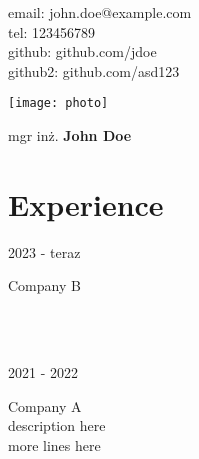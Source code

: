 \documentclass[12pt]{article}
\makeatletter
\newcommand{\signature}{
  \begin{flushright}
    {\huge mgr inż. \textbf{John Doe}}
  \end{flushright}
}
\newcommand{\photo}{
  \begin{center}
    \texttt{[image: photo]}
  \end{center}
}
\newcommand{\contactinfo}{
  \noindent
  email: john.doe@example.com\\
  tel: 123456789\\
  github: github.com/jdoe\\
  github2: github.com/asd123
}
\newcommand\historyentry[3]{
  \parbox[b]{70pt}{#1}
  \color{teal}
  \makebox[0pt][c]{$\bullet$}\vrule\quad
  \color{black}
  \parbox[t]{455pt}{\Large #2\\\normalsize #3\\[5pt]}\\[-3pt]
}
\makeatother
\begin{document}
\begin{paracol}{2}
  \begin{leftcolumn}
    \contactinfo
    \photo
  \end{leftcolumn}
  \begin{rightcolumn}
    \signature
    \section*{}
    \blindtext
  \end{rightcolumn}
\end{paracol}
\section*{Experience}
\historyentry{2023 - teraz}{Company B}{\blindtext}
\historyentry{2021 - 2022}{Company A}{description here\\more lines here}
\end{document}
